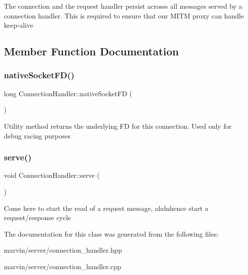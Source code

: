 The connection and the request handler persist acrosss all messages served by a connection handler. This is required to ensure that our M\+I\+TM proxy can handle keep-\/alive

\subsection{Member Function Documentation}
\mbox{\label{class_connection_handler_a26a9c6287af17142e2497b26afd020df}} 
\subsubsection{\texorpdfstring{native\+Socket\+F\+D()}{nativeSocketFD()}}
{\footnotesize\ttfamily long Connection\+Handler\+::native\+Socket\+FD (\begin{DoxyParamCaption}{ }\end{DoxyParamCaption})}

Utility method returns the underlying FD for this connection. Used only for debug racing purposes \mbox{\label{class_connection_handler_a113fc7138a4dd5ab03fdca63091002a6}} 
\subsubsection{\texorpdfstring{serve()}{serve()}}
{\footnotesize\ttfamily void Connection\+Handler\+::serve (\begin{DoxyParamCaption}{ }\end{DoxyParamCaption})}

Come here to start the read of a request message, ahdnhence start a request/response cycle 

The documentation for this class was generated from the following files\+:\begin{DoxyCompactItemize}
\item 
marvin/server/connection\+\_\+handler.\+hpp\item 
marvin/server/connection\+\_\+handler.\+cpp\end{DoxyCompactItemize}
